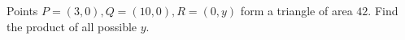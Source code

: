 Points $P=(3,0),Q=(10,0),R=(0,y)$ form a triangle of area $42$. Find the product of all possible $y$.
